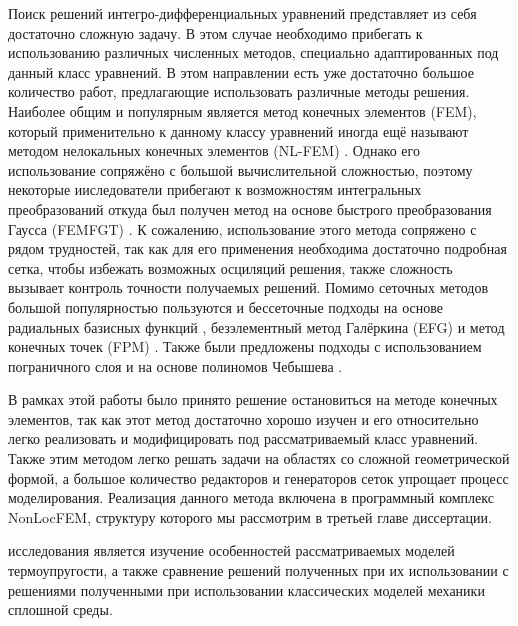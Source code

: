 Поиск решений интегро-дифференциальных уравнений представляет из себя достаточно сложную задачу. В этом случае необходимо прибегать к использованию различных численных методов, специально адаптированных под данный класс уравнений. В этом направлении есть уже достаточно большое количество работ, предлагающие использовать различные методы решения. Наиболее общим и популярным является метод конечных элементов (FEM), который применительно к данному классу уравнений иногда ещё называют методом нелокальных конечных элементов (NL-FEM) \cite{Polizzotto2, Pisano1}. Однако его использование сопряжёно с большой вычислительной сложностью, поэтому некоторые ииследователи прибегают к возможностям интегральных преобразований откуда был получен метод на основе быстрого преобразования Гаусса (FEMFGT) \cite{FastGaussTransform}. К сожалению, использование этого метода сопряжено с рядом трудностей, так как для его применения необходима достаточно подробная сетка, чтобы избежать возможных осциляций решения, также сложность вызывает контроль точности получаемых решений. Помимо сеточных методов большой популярностью пользуются и бессеточные подходы на основе радиальных базисных функций \cite{RadialBasis}, безэлементный метод Галёркина (EFG) и метод конечных точек (FPM) \cite{MeshFree}. Также были предложены подходы с использованием пограничного слоя \cite{BondaryLayer} и на основе полиномов Чебышева \cite{ChebPolynom}.

В рамках этой работы было принято решение остановиться на методе конечных элементов, так как этот метод достаточно хорошо изучен и его относительно легко реализовать и модифицировать под рассматриваемый класс уравнений. Также этим методом легко решать задачи на областях со сложной геометрической формой, а большое количество редакторов и генераторов сеток упрощает процесс моделирования. Реализация данного метода включена в программный комплекс NonLocFEM, структуру которого мы рассмотрим в третьей главе диссертации.



{\aim}
исследования является изучение особенностей рассматриваемых моделей термоупругости, а также сравнение решений полученных при их использовании с решениями полученными при использовании классических моделей механики сплошной среды.

